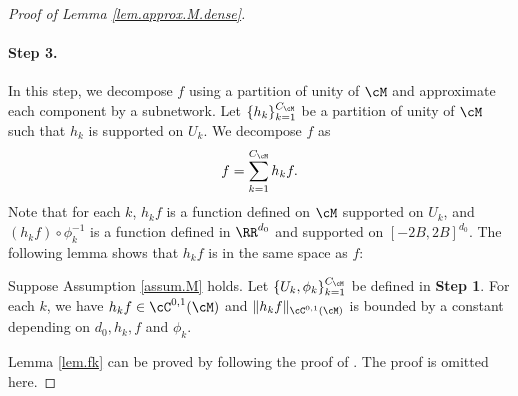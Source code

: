 \documentclass[11pt]{article} %
\begin{document}
\begin{proof}[Proof of Lemma \ref{lem.approx.M.dense}]
	\paragraph{Step 3.} In this step, we decompose $f$ using a partition of unity of $\cM$ and approximate each component by a subnetwork. Let $\{h_k\}_{k=1}^{C_{\cM}}$ be a partition of unity of $\cM$ such that $h_k$ is supported on $U_k$. We decompose $f$ as
	\begin{align*}
		f=\sum_{k=1}^{C_{\cM}} h_kf.
	\end{align*}
	Note that for each $k$, $h_kf$ is a function defined on $\cM$ supported on $U_k$, and $(h_kf)\circ \phi_k^{-1}$ is a function defined in $\RR^{d_0}$ and supported on $[-2B,2B]^{d_0}$. The following lemma shows that $h_kf$ is in the same space as $f$:
	\begin{lemma}\label{lem.fk}
		Suppose Assumption \ref{assum.M} holds. Let $\{U_k,\phi_k\}_{k=1}^{C_{\cM}}$ be defined in {\bf Step 1}. For each $k$, we have $h_kf\in \cC^{0,1}(\cM)$ and $\|h_kf\|_{\cC^{0,1}(\cM)}$ is bounded by a constant depending on $d_0,h_k,f$ and $\phi_k$.
	\end{lemma}
	Lemma \ref{lem.fk} can be proved by following the proof of \citep[Lemma 2]{chen2019nonparametric}. The proof is omitted here.

\end{proof}
\end{document}

